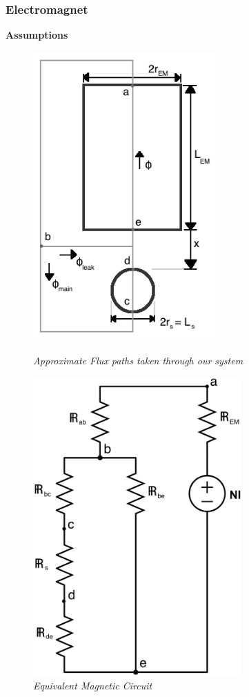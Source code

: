 \documentclass{article}
\theoremstyle{plain}
\theoremstyle{definition}
\theoremstyle{remark}
\begin{document}
\subsubsection*{Electromagnet}
\textbf{Assumptions}

\begin{figure}[htb]
\begin{minipage}[b]{0.45\linewidth}
\centering
\includegraphics[width = 7cm]{flux_diagram.png}
\caption{\emph{Approximate Flux paths taken through our system}}
\label{Q1_a3L}
\end{minipage}
\hspace{0.5cm}
\begin{minipage}[b]{0.45\linewidth}
\centering
\includegraphics[width = 8cm]{magnetic_circuit.png}
\caption{\emph{Equivalent Magnetic Circuit}}
\label{Q1_a3R}
\end{minipage}
\end{figure}
\end{document}
